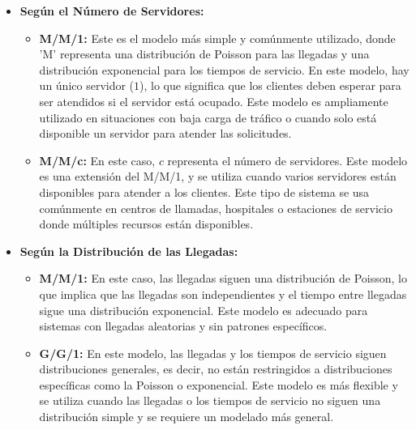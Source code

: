 \documentclass{article}
\begin{document}
\begin{itemize}
    \item \textbf{Según el Número de Servidores:}
    \begin{itemize}
        \item \textbf{M/M/1:} Este es el modelo más simple y comúnmente utilizado, donde 'M' representa una distribución de Poisson para las llegadas y una distribución exponencial para los tiempos de servicio. En este modelo, hay un único servidor (\(1\)), lo que significa que los clientes deben esperar para ser atendidos si el servidor está ocupado. Este modelo es ampliamente utilizado en situaciones con baja carga de tráfico o cuando solo está disponible un servidor para atender las solicitudes.
        \item \textbf{M/M/c:} En este caso, \(c\) representa el número de servidores. Este modelo es una extensión del M/M/1, y se utiliza cuando varios servidores están disponibles para atender a los clientes. Este tipo de sistema se usa comúnmente en centros de llamadas, hospitales o estaciones de servicio donde múltiples recursos están disponibles.
    \end{itemize}
    
    \item \textbf{Según la Distribución de las Llegadas:}
    \begin{itemize}
        \item \textbf{M/M/1:} En este caso, las llegadas siguen una distribución de Poisson, lo que implica que las llegadas son independientes y el tiempo entre llegadas sigue una distribución exponencial. Este modelo es adecuado para sistemas con llegadas aleatorias y sin patrones específicos.
        \item \textbf{G/G/1:} En este modelo, las llegadas y los tiempos de servicio siguen distribuciones generales, es decir, no están restringidos a distribuciones específicas como la Poisson o exponencial. Este modelo es más flexible y se utiliza cuando las llegadas o los tiempos de servicio no siguen una distribución simple y se requiere un modelado más general.
    \end{itemize}
    

\end{itemize}
\end{document}
